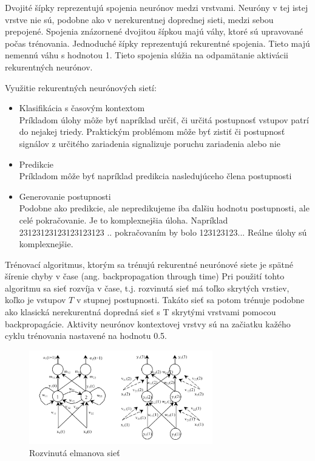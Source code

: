 Dvojité šípky reprezentujú spojenia neurónov medzi vrstvami. Neuróny v tej istej vrstve nie sú, podobne ako
v nerekurentnej doprednej sieti, medzi sebou prepojené. Spojenia znázornené dvojitou šípkou majú váhy, ktoré 
sú upravované počas trénovania.
Jednoduché šípky reprezentujú rekurentné spojenia. Tieto majú nemennú váhu s hodnotou 1.
Tieto spojenia slúžia na odpamätanie aktivácii rekurentných neurónov. 

Využitie rekurentných neurónových sietí:\\
\begin{itemize}
	\item Klasifikácia s časovým kontextom \\
	Príkladom úlohy môže byť napríklad určiť, či určitá postupnosť vstupov patrí do nejakej triedy.
	Praktickým problémom môže byť zistiť či postupnosť signálov z určitého zariadenia signalizuje poruchu zariadenia alebo nie
	\item Predikcie\\
	Príkladom môže byť napríklad predikcia nasledujúceho člena postupnosti
	\item Generovanie postupnosti\\
	Podobne ako predikcie, ale nepredikujeme iba ďalšiu hodnotu postupnosti, ale celé pokračovanie.
	Je to komplexnejšia úloha. Napríklad 23123123123123123123 .. pokračovaním by bolo 123123123...
	Reálne úlohy sú komplexnejšie.
\end{itemize}

Trénovací algoritmus, ktorým sa trénujú rekurentné neurónové siete
je spätné šírenie chyby v čase (ang. backpropagation through time)
Pri použití tohto algoritmu sa sieť rozvíja v čase, t.j. rozvinutá sieť má
toľko skrytých vrstiev, koľko je vstupov $T$ v stupnej postupnosti. 
Takáto sieť sa potom trénuje podobne ako klasická nerekurentná dopredná sieť s T skrytými vrstvami pomocou backpropagácie.
Aktivity neurónov kontextovej vrstvy sú na začiatku kažého cyklu trénovania nastavené
na hodnotu 0.5.


\begin{figure}[H]
	\centering
	\includegraphics[width=8cm]{assets/elman}
	\caption{Rozvinutá elmanova sieť}
\end{figure}


